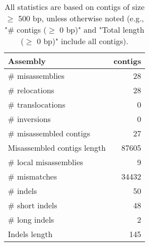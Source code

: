 \documentclass[12pt,a4paper]{article}
\begin{document}
\begin{table}[ht]
\begin{center}
\caption{All statistics are based on contigs of size $\geq$ 500 bp, unless otherwise noted (e.g., "\# contigs ($\geq$ 0 bp)" and "Total length ($\geq$ 0 bp)" include all contigs).}
\begin{tabular}{|l*{1}{|r}|}
\hline
Assembly & contigs \\ \hline
\# misassemblies & 28 \\ \hline
\hspace{5mm}\# relocations & 28 \\ \hline
\hspace{5mm}\# translocations & 0 \\ \hline
\hspace{5mm}\# inversions & 0 \\ \hline
\# misassembled contigs & 27 \\ \hline
Misassembled contigs length & 87605 \\ \hline
\# local misassemblies & 9 \\ \hline
\# mismatches & 34432 \\ \hline
\# indels & 50 \\ \hline
\hspace{5mm}\# short indels & 48 \\ \hline
\hspace{5mm}\# long indels & 2 \\ \hline
Indels length & 145 \\ \hline
\end{tabular}
\end{center}
\end{table}
\end{document}
